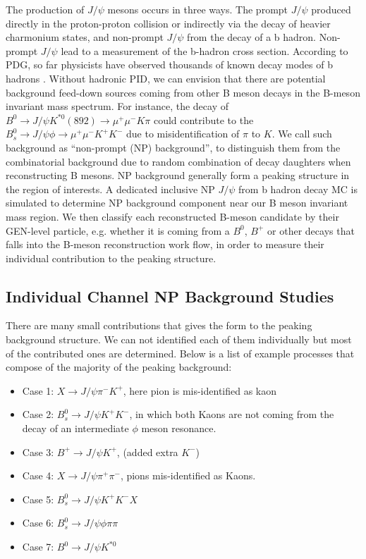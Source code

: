 The production of $J/\psi$ mesons occurs in three ways. The prompt $J/\psi$ produced directly in the proton-proton collision or indirectly via the decay of heavier charmonium states, and non-prompt $J/\psi$ from the decay of a b hadron. Non-prompt $J/\psi$ lead to a measurement of the b-hadron cross section. According to PDG, so far physicists have observed thousands of known decay modes of b hadrons \cite{AlphaTheoEx}. Without hadronic PID, we can envision that there are potential background feed-down sources coming from other B meson decays in the B-meson invariant mass spectrum. For instance, the decay of $B^0 \rightarrow J/\psi K^{*0} (892) \rightarrow \mu^+ \mu^- K\pi$ could contribute to the $B^0_s \rightarrow J/\psi \phi \rightarrow \mu^+ \mu^- K^+ K^-$ due to misidentification of $\pi$ to $K$. We call such background as ``non-prompt (NP) background'', to distinguish them from the combinatorial background due to random combination of decay daughters when reconstructing B mesons. NP background generally form a peaking structure in the region of interests. A dedicated inclusive NP $J/\psi$ from b hadron decay MC is simulated to determine NP background component near our B meson invariant mass region. We then classify each reconstructed B-meson candidate by their GEN-level particle, e.g. whether it is coming from a $B^{0}$, $B^{+}$ or other decays that falls into the B-meson reconstruction work flow, in order to measure their individual contribution to the peaking structure.


\subsection{Individual Channel NP Background Studies} 


\label{sec:individual_channels}
There are many small contributions that gives the form to the peaking background structure. We can not identified each of them individually but most of the contributed ones are determined.
Below is a list of example processes that compose of the majority of the peaking background:

\begin{itemize}
\item {Case 1: $ X \rightarrow J/\psi  \pi^{-}  K^{+}$, here pion is mis-identified as kaon}
\item {Case 2: $ B_{s}^{0} \rightarrow J/\psi  K^+ K^- $, in which both Kaons are not coming from the decay of an intermediate $\phi$ meson resonance.}
\item {Case 3: $ B^{+} \rightarrow J/\psi  K^{+}$, (added extra $K^-$)} 
\item {Case 4: $ X \rightarrow J/\psi  \pi^{+} \pi^{-}$, pions mis-identified as Kaons. }
\item {Case 5: $ B_{s}^{0} \rightarrow J/\psi K^{+} K^{-} X $ }
\item {Case 6: $ B_{s}^{0} \rightarrow J/\psi \phi \pi \pi $}
\item {Case 7: $B^0 \rightarrow J/\psi  K^{*0} $}
\end{itemize}

